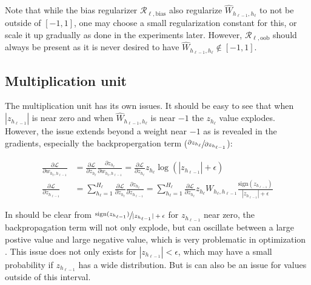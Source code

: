 Note that while the bias regularizer $\mathcal{R}_{\ell,\mathrm{bias}}$ also regularize $\hat{W}_{h_{\ell-1},h_\ell}$ to not be outside of $[-1, 1]$, one may choose a small regularization constant for this, or scale it up gradually as done in the experiments later. However, $\mathcal{R}_{\ell,\mathrm{oob}}$ should always be present as it is never desired to have $\hat{W}_{h_{\ell-1},h_\ell} \not\in [-1, 1]$.

\subsection{Multiplication unit}

The multiplication unit has its own issues. It should be easy to see that when $|z_{h_{\ell-1}}|$ is near zero and when $\hat{W}_{h_{\ell-1},h_\ell}$ is near $-1$ the $z_{h_\ell}$ value explodes. However, the issue extends beyond a weight near $-1$ as is revealed in the gradients, especially the backpropergation term ($\sfrac{\partial z_{h_\ell}}{\partial z_{h_{\ell-1}}}$):

\begin{equation}
\begin{aligned}
\frac{\partial \mathcal{L}}{\partial w_{h_{\ell}, h_{\ell - 1}}} &= \frac{\partial \mathcal{L}}{\partial z_{h_\ell}} \frac{\partial z_{h_\ell}}{\partial w_{h_{\ell}, h_{\ell - 1}}} = \frac{\partial \mathcal{L}}{\partial z_{h_\ell}} z_{h_\ell} \log(|z_{h_{\ell-1}}| + \epsilon) \\
\frac{\partial \mathcal{L}}{\partial z_{h_{\ell-1}}} &= \sum_{h_\ell = 1}^{H_\ell} \frac{\partial \mathcal{L}}{\partial z_{h_\ell}} \frac{\partial z_{h_\ell}}{\partial z_{h_{\ell-1}}} = \sum_{h_\ell = 1}^{H_\ell} \frac{\partial \mathcal{L}}{\partial z_{h_\ell}} z_{h_\ell} W_{h_\ell, h_{\ell-1}} \frac{\mathrm{sign}(z_{h_{\ell-1}})}{|z_{h_{\ell-1}}| + \epsilon}
\end{aligned}
\end{equation}

In should be clear from $\sfrac{\mathrm{sign}(z_{h_{\ell-1}})}{|z_{h_{\ell-1}}| + \epsilon}$ for $z_{h_{\ell-1}}$ near zero, the backpropagation term will not only explode, but can oscillate between a large postive value and large negative value, which is very problematic in optimization \cite{adam-optimization}. This issue does not only exists for $|z_{h_{\ell-1}}| < \epsilon$, which may have a small probability if $z_{h_{\ell-1}}$ has a wide distribution. But is can also be an issue for values outside of this interval.

